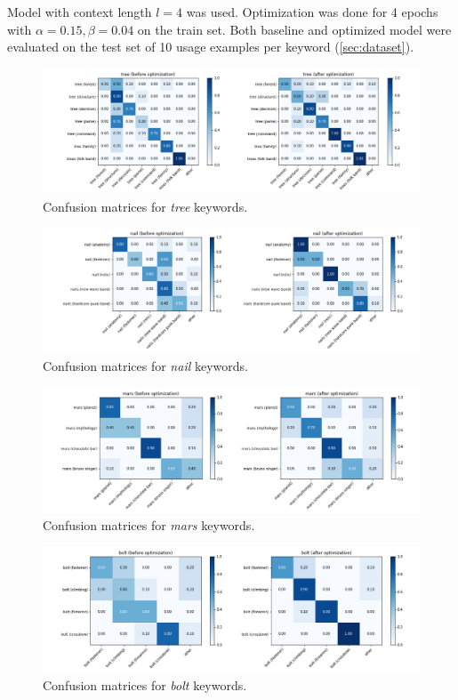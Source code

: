 \documentclass{llncs}
\begin{document}
Model with context length \(l=4\) was used.  Optimization was done for 4 epochs with \(\alpha=0.15, \beta=0.04\) on the train set. Both baseline and optimized model were evaluated on the test set of 10 usage examples per keyword (\ref{sec:dataset}).

\begin{figure}
    \centering
    \caption{Confusion matrices for \textit{tree} keywords.}
    \label{fig:cm_tree}
    \includegraphics[scale=0.38]{res/cm_tree.png}
\end{figure}

\begin{figure}
    \centering
    \caption{Confusion matrices for \textit{nail} keywords.}
    \label{fig:cm_nail}
    \includegraphics[scale=0.38]{res/cm_nail.png}
\end{figure}

\begin{figure}
    \centering
    \caption{Confusion matrices for \textit{mars} keywords.}
    \label{fig:cm_mars}
    \includegraphics[scale=0.38]{res/cm_mars.png}
\end{figure}

\begin{figure}
    \centering
    \caption{Confusion matrices for \textit{bolt} keywords.}
    \label{fig:cm_bolt}
    \includegraphics[scale=0.38]{res/cm_bolt.png}
\end{figure}
\end{document}
